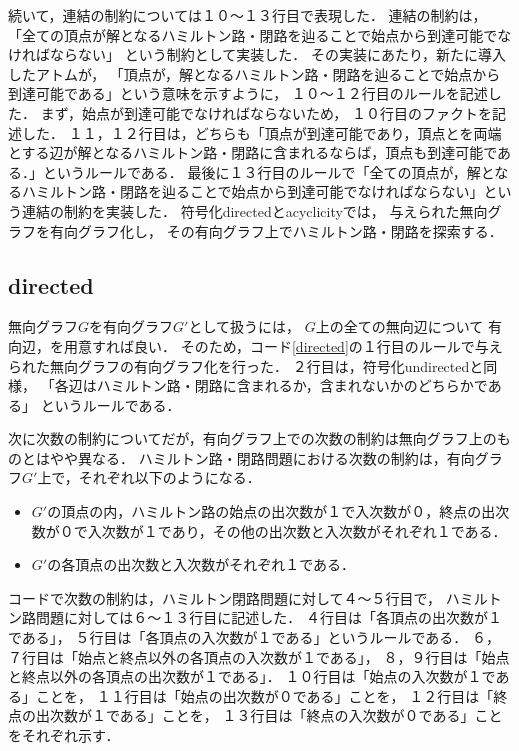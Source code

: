 続いて，連結の制約については１０〜１３行目で表現した．
連結の制約は，
「全ての頂点が解となるハミルトン路・閉路を辿ることで始点から到達可能でなければならない」
という制約として実装した．
その実装にあたり，新たに導入したアトムが，
「頂点が，解となるハミルトン路・閉路を辿ることで始点から到達可能である」という意味を示すように，
１０〜１２行目のルールを記述した．
まず，始点が到達可能でなければならないため，
１０行目のファクトを記述した．
１１，１２行目は，どちらも「頂点が到達可能であり，頂点とを両端とする辺が解となるハミルトン路・閉路に含まれるならば，頂点も到達可能である．」というルールである．
最後に１３行目のルールで「全ての頂点が，解となるハミルトン路・閉路を辿ることで始点から到達可能でなければならない」という連結の制約を実装した．
\newpage
符号化directedとacyclicityでは，
与えられた無向グラフを有向グラフ化し，
その有向グラフ上でハミルトン路・閉路を探索する．
\subsection{directed}

無向グラフ$G$を有向グラフ$G'$として扱うには，
$G$上の全ての無向辺について
有向辺，を用意すれば良い．
そのため，コード\ref{directed}の１行目のルールで与えられた無向グラフの有向グラフ化を行った．
２行目は，符号化undirectedと同様，
「各辺はハミルトン路・閉路に含まれるか，含まれないかのどちらかである」
というルールである．

次に次数の制約についてだが，有向グラフ上での次数の制約は無向グラフ上のものとはやや異なる．
ハミルトン路・閉路問題における次数の制約は，有向グラフ$G'$上で，それぞれ以下のようになる．
\begin{itemize}
\item $G'$の頂点の内，ハミルトン路の始点の出次数が１で入次数が０，終点の出次数が０で入次数が１であり，その他の出次数と入次数がそれぞれ１である．
\item $G'$の各頂点の出次数と入次数がそれぞれ１である．
\end{itemize}
コードで次数の制約は，ハミルトン閉路問題に対して４〜５行目で，
ハミルトン路問題に対しては６〜１３行目に記述した．
４行目は「各頂点の出次数が１である」，
５行目は「各頂点の入次数が１である」というルールである．
６，７行目は「始点と終点以外の各頂点の入次数が１である」，
８，９行目は「始点と終点以外の各頂点の出次数が１である」．
１０行目は「始点の入次数が１である」ことを，
１１行目は「始点の出次数が０である」ことを，
１２行目は「終点の出次数が１である」ことを，
１３行目は「終点の入次数が０である」ことをそれぞれ示す．


